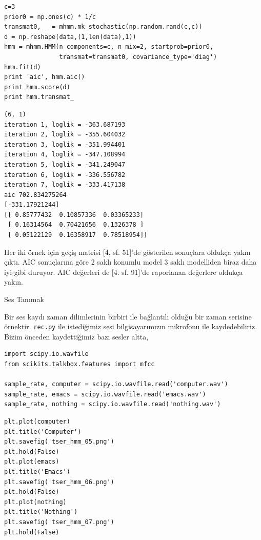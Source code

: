 \documentclass[12pt,fleqn]{article}\usepackage{../../common}
\begin{document}
\begin{verbatim}
c=3
prior0 = np.ones(c) * 1/c
transmat0, _ = mhmm.mk_stochastic(np.random.rand(c,c))
d = np.reshape(data,(1,len(data),1))
hmm = mhmm.HMM(n_components=c, n_mix=2, startprob=prior0, 
               transmat=transmat0, covariance_type='diag')        
hmm.fit(d)
print 'aic', hmm.aic()        
print hmm.score(d)
print hmm.transmat_
\end{verbatim}

\begin{verbatim}
(6, 1)
iteration 1, loglik = -363.687193
iteration 2, loglik = -355.604032
iteration 3, loglik = -351.994401
iteration 4, loglik = -347.108994
iteration 5, loglik = -341.249047
iteration 6, loglik = -336.556782
iteration 7, loglik = -333.417138
aic 702.834275264
[-331.17921244]
[[ 0.85777432  0.10857336  0.03365233]
 [ 0.16314564  0.70421656  0.1326378 ]
 [ 0.05122129  0.16358917  0.78518954]]
\end{verbatim}

Her iki örnek için geçiş matrisi [4, sf. 51]'de gösterilen sonuçlara
oldukça yakın çıktı. AIC sonuçlarına göre 2 saklı konumlu model 3 saklı
modelliden biraz daha iyi gibi duruyor. AIC değerleri de [4. sf. 91]'de
raporlanan değerlere oldukça yakın.

Ses Tanımak

Bir ses kaydı zaman dilimlerinin birbiri ile bağlantılı olduğu bir zaman
serisine örnektir. \verb!rec.py! ile istediğimiz sesi bilgisayarımızın
mikrofonu ile kaydedebiliriz. Bizim önceden kaydettiğimiz bazı sesler altta,

\begin{verbatim}
import scipy.io.wavfile
from scikits.talkbox.features import mfcc

sample_rate, computer = scipy.io.wavfile.read('computer.wav')
sample_rate, emacs = scipy.io.wavfile.read('emacs.wav')
sample_rate, nothing = scipy.io.wavfile.read('nothing.wav')
\end{verbatim}

\begin{verbatim}
plt.plot(computer)
plt.title('Computer')
plt.savefig('tser_hmm_05.png')
plt.hold(False)
plt.plot(emacs)
plt.title('Emacs')
plt.savefig('tser_hmm_06.png')
plt.hold(False)
plt.plot(nothing)
plt.title('Nothing')
plt.savefig('tser_hmm_07.png')
plt.hold(False)
\end{verbatim}
\end{document}
